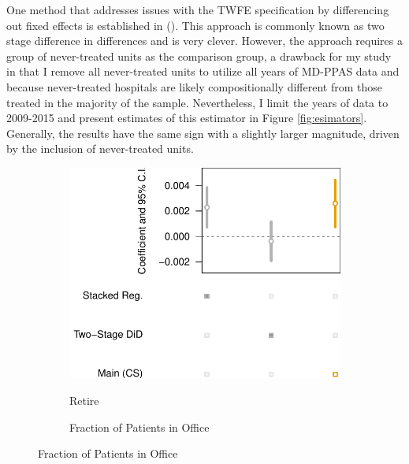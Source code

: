 \documentclass[12pt]{article}
\begin{document}
One method that addresses issues with the TWFE specification by differencing out fixed effects is established in \citeauthor{gardner2021two} (\citeyear{gardner2021two}). This approach is commonly known as two stage difference in differences and is very clever. However, the approach requires a group of never-treated units as the comparison group, a drawback for my study in that I remove all never-treated units to utilize all years of MD-PPAS data and because never-treated hospitals are likely compositionally different from those treated in the majority of the sample. Nevertheless, I limit the years of data to 2009-2015 and present estimates of this estimator in Figure \ref{fig:esimators}. Generally, the results have the same sign with a slightly larger magnitude, driven by the inclusion of never-treated units. 

\begin{figure}[t!]
\begin{subfigure}{0.48\textwidth}
\caption{Retire}
\includegraphics[width=\linewidth]{Objects/retire_est_plot.pdf}
\label{fig:a}
\end{subfigure}\hspace*{\fill}
\begin{subfigure}{0.48\textwidth}
\caption{Fraction of Patients in Office}

\end{subfigure}
\end{figure}
\end{document}
